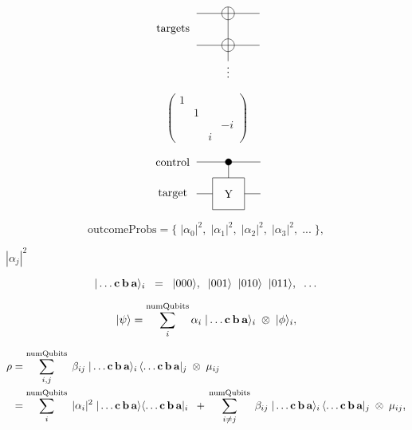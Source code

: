 \documentclass{article}
\begin{document}
\[
             \begin{tikzpicture}[scale=.5]
             \node[draw=none] at (-3.5, 1) {targets};
             \draw (0, -1) -- (0, 2.4);
             
             \draw (-2,2) -- (2, 2);
             \draw (0, 2) circle (.4);

             \draw (-2,0) -- (2, 0);
             \draw (0, 0) circle (.4);
             
             \node[draw=none] at (0, -1.5) {$\vdots$};
             \end{tikzpicture}
 \]
\pagebreak

\[
\begin{pmatrix}
1 \\
& 1 \\\
& & & -i \\
& & i
\end{pmatrix}
\]
\pagebreak

\[
             \begin{tikzpicture}[scale=.5]
             \node[draw=none] at (-3.5, 2) {control};
             \node[draw=none] at (-3.5, 0) {target};

             \draw (-2, 2) -- (2, 2);
             \draw[fill=black] (0, 2) circle (.2);
             \draw (0, 2) -- (0, 1);
             
             \draw (-2,0) -- (-1, 0);
             \draw (1, 0) -- (2, 0);
             \draw (-1,-1)--(-1,1)--(1,1)--(1,-1)--cycle;
             \node[draw=none] at (0, 0) {Y};
             \end{tikzpicture}
 \]
\pagebreak

\[
    \text{outcomeProbs} = \{ \; |\alpha_0|^2, \; |\alpha_1|^2, \; |\alpha_2|^2, \; |\alpha_3|^2, \; ... \; \},
  \]
\pagebreak

$|\alpha_j|^2$
\pagebreak

\[
     |\dots\textbf{c\,b\,a}\rangle_i \; \; = \;\; |000\rangle,  \;\; |001\rangle \;\; |010\rangle \;\; |011\rangle, \;\; \dots
  \]
\pagebreak

\[
     |\psi\rangle = \sum\limits_i^{\text{numQubits}} \alpha_i \; |\dots\textbf{c\,b\,a}\rangle_i 
       \; \otimes \; |\phi\rangle_i,
  \]
\pagebreak

\[
     \begin{aligned}
     \rho &= \sum\limits_{i,j}^{\text{numQubits}} \; \beta_{ij} \; |\dots\textbf{c\,b\,a}\rangle_i\,\langle\dots\textbf{c\,b\,a}|_j 
           \; \otimes \; \mu_{ij} \\
          &= \sum\limits_i^{\text{numQubits}} \; |\alpha_i|^2 \;  |\dots\textbf{c\,b\,a}\rangle\langle\dots\textbf{c\,b\,a}|_i  \;\; + \, 
           \sum\limits_{i \ne j}^{\text{numQubits}} \; \beta_{ij} \; |\dots\textbf{c\,b\,a}\rangle_i\,\langle\dots\textbf{c\,b\,a}|_j 
           \; \otimes \; \mu_{ij},
      \end{aligned}
  \]
\pagebreak
\end{document}
